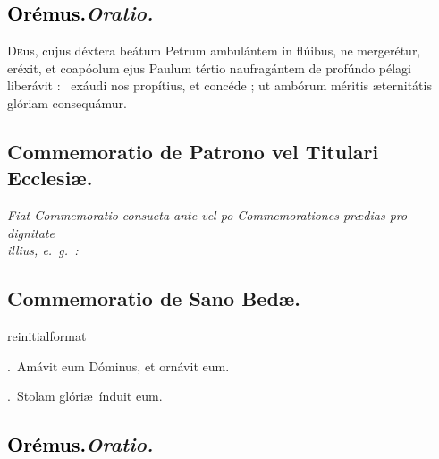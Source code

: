 \documentclass[12pt]{article} %
\newcommand{\myaboveinitial}[1]{%
    \expandafter\renewcommand\csname greinitialformat\endcsname[1]{%
        \fontsize{43}{43}\selectfont ##1
    }
    \gresetfirstlineaboveinitial{\textcolor{benred8}{\raisebox{6.0mm}{\small \textsc{\textbf{#1}}}}}{}
}
\newenvironment{rubric}{\vspace{1 mm}\color{benred8} \itshape \leftskip 0in \setlength{\parindent}{0.25in}}{\vspace{1 mm}}
\newenvironment{response}{\leftskip 0in \setlength{\parindent}{0in}}{\vspace{1 mm}}
\let\oldgresixstar\gresixstar
\renewcommand{\gresixstar}{\textcolor{benred8}{\oldgresixstar}}
\let\oldVbar\Vbar
\renewcommand{\Vbar}{\textcolor{benred8}{\oldVbar .}}
\let\oldRbar\Rbar
\renewcommand{\Rbar}{\textcolor{benred8}{\oldRbar .}}
\def\capitulumSpace{\hspace{20 mm}}
\begin{document}
\subsection*{\textcolor{black}{Or\'{e}mus.}\capitulumSpace \emph{Oratio.}}

\begin{response}\lettrine{D}{e}us, cujus d\'{e}xtera be\'{a}tum Petrum ambul\'{a}ntem in fl\'{u}ibus, ne merger\'{e}tur, er\'{e}xit, et coap\'{o}olum ejus Paulum t\'{e}rtio naufrag\'{a}ntem de prof\'{u}ndo p\'{e}lagi liber\'{a}vit : \gresixstar\ ex\'{a}udi nos prop\'{i}tius, et conc\'{e}de ; ut amb\'{o}rum m\'{e}ritis \ae ternit\'{a}tis gl\'{o}riam consequ\'{a}mur.

\end{response}

\newpage


\subsection*{Commemoratio de Patrono vel Titulari Ecclesi\ae .}

\begin{rubric}
Fiat Commemoratio consueta ante vel po Commemorationes pr\ae dias pro dignitate\\illius, e.~g.~:

\end{rubric}

\subsection*{Commemoratio de Sano Bed\ae .}


\myaboveinitial{II}

\begin{response}
\Vbar\ Am\'{a}vit eum D\'{o}minus, et orn\'{a}vit eum.

\Rbar\ Stolam gl\'{o}ri\ae\ \'{i}nduit eum.

\end{response}

\subsection*{\textcolor{black}{Or\'{e}mus.}\capitulumSpace \emph{Oratio.}}
\end{document}
